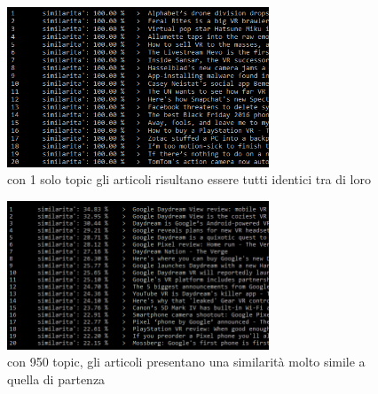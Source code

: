 \documentclass{article}
\begin{document}
\begin{figure}[h]
	\includegraphics[width=7.8cm]{k2.png}
	\centering
	\caption{con 1 solo topic gli articoli risultano essere tutti identici tra di loro}
\end{figure}
\begin{figure}[h]
	\includegraphics[width=7.8cm]{k950.png}
	\centering
	\caption{con 950 topic, gli articoli presentano una similarità molto simile a quella di partenza}
\end{figure}


\enddocument
\end{document}
